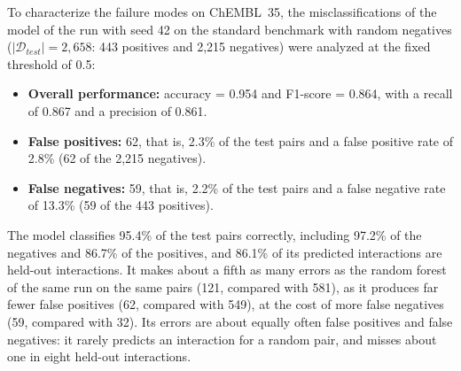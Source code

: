 \documentclass[11pt,letterpaper]{article}
\begin{document}
To characterize the failure modes on ChEMBL~35, the misclassifications of the model of the run with seed 42 on the standard benchmark with random negatives ($|\mathcal{D}_{test}| = 2{,}658$: 443 positives and 2,215 negatives) were analyzed at the fixed threshold of 0.5:

\begin{itemize}
    \item \textbf{Overall performance:} accuracy = 0.954 and F1-score = 0.864, with a recall of 0.867 and a precision of 0.861.
    \item \textbf{False positives:} 62, that is, 2.3\% of the test pairs and a false positive rate of 2.8\% (62 of the 2,215 negatives).
    \item \textbf{False negatives:} 59, that is, 2.2\% of the test pairs and a false negative rate of 13.3\% (59 of the 443 positives).
\end{itemize}

The model classifies 95.4\% of the test pairs correctly, including 97.2\% of the negatives and 86.7\% of the positives, and 86.1\% of its predicted interactions are held-out interactions. It makes about a fifth as many errors as the random forest of the same run on the same pairs (121, compared with 581), as it produces far fewer false positives (62, compared with 549), at the cost of more false negatives (59, compared with 32). Its errors are about equally often false positives and false negatives: it rarely predicts an interaction for a random pair, and misses about one in eight held-out interactions.
\end{document}
